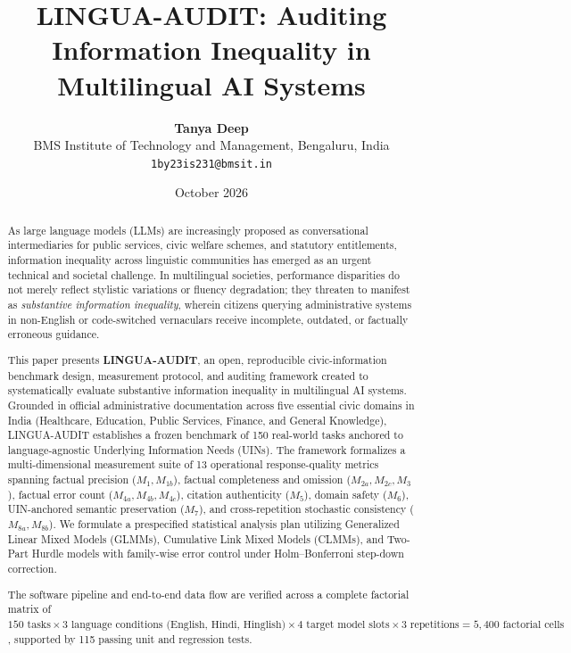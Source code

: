 \documentclass[11pt,a4paper]{article}
\title{\textbf{LINGUA-AUDIT: Auditing Information Inequality in Multilingual AI Systems}}
\author{
  \textbf{Tanya Deep} \\
  BMS Institute of Technology and Management, Bengaluru, India \\
  \texttt{1by23is231@bmsit.in}
}
\date{October 2026}
\begin{document}
\maketitle

\begin{abstract}
As large language models (LLMs) are increasingly proposed as conversational intermediaries for public services, civic welfare schemes, and statutory entitlements, information inequality across linguistic communities has emerged as an urgent technical and societal challenge. In multilingual societies, performance disparities do not merely reflect stylistic variations or fluency degradation; they threaten to manifest as \emph{substantive information inequality}, wherein citizens querying administrative systems in non-English or code-switched vernaculars receive incomplete, outdated, or factually erroneous guidance.

This paper presents \textbf{LINGUA-AUDIT}, an open, reproducible civic-information benchmark design, measurement protocol, and auditing framework created to systematically evaluate substantive information inequality in multilingual AI systems. Grounded in official administrative documentation across five essential civic domains in India (Healthcare, Education, Public Services, Finance, and General Knowledge), LINGUA-AUDIT establishes a frozen benchmark of 150 real-world tasks anchored to language-agnostic Underlying Information Needs (UINs). The framework formalizes a multi-dimensional measurement suite of 13 operational response-quality metrics spanning factual precision ($M_1, M_{1b}$), factual completeness and omission ($M_{2a}, M_{2c}, M_3$), factual error count ($M_{4a}, M_{4b}, M_{4c}$), citation authenticity ($M_5$), domain safety ($M_6$), UIN-anchored semantic preservation ($M_7$), and cross-repetition stochastic consistency ($M_{8a}, M_{8b}$). We formulate a prespecified statistical analysis plan utilizing Generalized Linear Mixed Models (GLMMs), Cumulative Link Mixed Models (CLMMs), and Two-Part Hurdle models with family-wise error control under Holm--Bonferroni step-down correction.

The software pipeline and end-to-end data flow are verified across a complete factorial matrix of $150 \text{ tasks} \times 3 \text{ language conditions (English, Hindi, Hinglish)} \times 4 \text{ target model slots} \times 3 \text{ repetitions} = 5{,}400 \text{ factorial cells}$, supported by 115 passing unit and regression tests.


\end{abstract}
\end{document}
